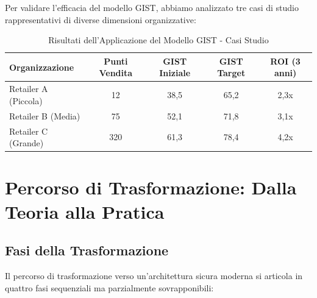 Per validare l'efficacia del modello GIST, abbiamo analizzato tre casi di studio rappresentativi di diverse dimensioni organizzative:

\begin{table}[h!]
\centering
\caption{Risultati dell'Applicazione del Modello GIST - Casi Studio}
\label{tab:gist_case_studies}
\begin{tabular}{|l|c|c|c|c|}
\hline
\textbf{Organizzazione} & \textbf{Punti Vendita} & \textbf{GIST Iniziale} & \textbf{GIST Target} & \textbf{ROI (3 anni)} \\
\hline
Retailer A (Piccola) & 12 & 38,5 & 65,2 & 2,3x \\
Retailer B (Media) & 75 & 52,1 & 71,8 & 3,1x \\
Retailer C (Grande) & 320 & 61,3 & 78,4 & 4,2x \\
\hline
\end{tabular}
\end{table}

\section{Percorso di Trasformazione: Dalla Teoria alla Pratica}
\label{sec:5.4}

\subsection{Fasi della Trasformazione}
\label{subsec:5.4.1}

Il percorso di trasformazione verso un'architettura sicura moderna si articola in quattro fasi sequenziali ma parzialmente sovrapponibili:

